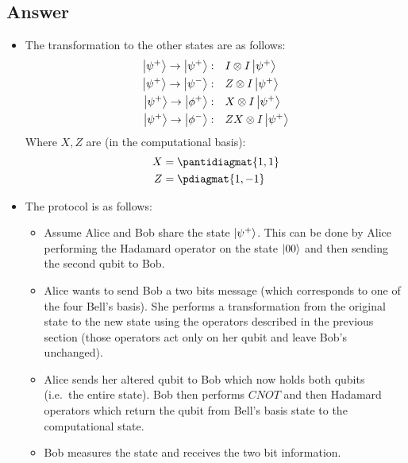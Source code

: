 \subsection*{Answer}
\begin{itemize}
    \item[a)] The transformation to the other states are as follows:
    \begin{align*}
        \ket{\psi^+}\rightarrow\ket{\psi^+}:&\quad I\otimes I\ket{\psi^+}\\
        \ket{\psi^+}\rightarrow\ket{\psi^-}:&\quad Z\otimes I\ket{\psi^+}\\
        \ket{\psi^+}\rightarrow\ket{\phi^+}:&\quad X\otimes I\ket{\psi^+}\\
        \ket{\psi^+}\rightarrow\ket{\phi^-}:&\quad ZX\otimes I\ket{\psi^+}\\
    \end{align*}
    Where $X, Z$ are (in the computational basis):
    \begin{align*}
        X &= \pantidiagmat{1,1}\\
        Z &= \pdiagmat{1,-1}\\
    \end{align*}
    \item[b)] The protocol is as follows:
        \begin{itemize}
            \item[0)] Assume Alice and Bob share the state $\ket{\psi^+}$.
            This can be done by Alice performing the Hadamard operator on the state $\ket{00}$ and then sending the second qubit to Bob.
            \item[1)]  Alice wants to send Bob a two bits message (which corresponds to one of the four Bell's basis).
            She performs a transformation from the original state to the new state using the operators described in the previous section (those operators act only on her qubit and leave Bob's unchanged).
            \item[2)] Alice sends her altered qubit to Bob which now holds both qubits (i.e.\ the entire state).
            Bob then performs $CNOT$ and then Hadamard operators which return the qubit from Bell's basis state to the computational state.
            \item[3)] Bob measures the state and receives the two bit information.
        \end{itemize}
\end{itemize}